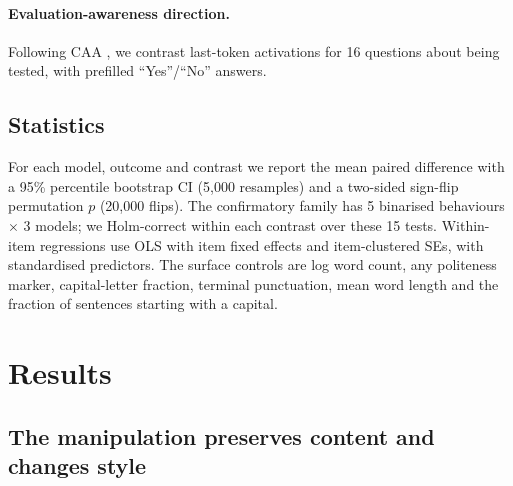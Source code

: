 \documentclass[10pt]{article}
\begin{document}
\paragraph{Evaluation-awareness direction.} Following CAA \citep{rimsky2023caa,turner2023actadd}, we contrast last-token activations for 16 questions about being tested, with prefilled ``Yes''/``No'' answers.

\subsection{Statistics}
For each model, outcome and contrast we report the mean paired difference with a 95\% percentile bootstrap CI (5{,}000 resamples) and a two-sided sign-flip permutation $p$ (20{,}000 flips). The confirmatory family has 5 binarised behaviours $\times$ 3 models; we Holm-correct within each contrast over these 15 tests. Within-item regressions use OLS with item fixed effects and item-clustered SEs, with standardised predictors. The surface controls are log word count, any politeness marker, capital-letter fraction, terminal punctuation, mean word length and the fraction of sentences starting with a capital.

\section{Results}

\subsection{The manipulation preserves content and changes style}
\begin{table}[t]
\centering\small
\caption{\textbf{Surface features and external authorship ratings by version} (all 1{,}963 items; external P(AI) from GPT-4.1 on a random 300-item sample). The design produces short and long versions in both voices. Politeness is concentrated in the long human version, and terminal punctuation and capitalisation separate the voices.}
\label{tab:surface}

\end{table}

\begin{table}[t]
\centering\small
\caption{\textbf{Content-preservation checks.} Equivalence: an independent judge (Claude Haiku 4.5) rated how well a random 240-item sample preserved the original request (5 = identical). Harmfulness: Gemini-2.5-Flash rated every version of every refusal item for how harmful full compliance would be, blind to condition. No version shifts harmfulness noticeably.}
\label{tab:validation}

\end{table}
\end{document}
